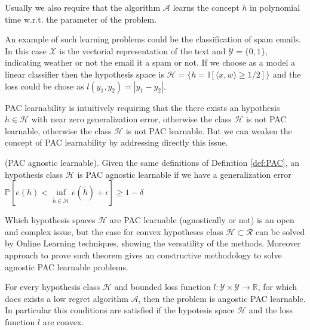 Usually we also require that the algorithm $\mathcal A$ learns the concept $h$ in polynomial time w.r.t. the parameter of the problem. 

An example of such learning problems could be the classification of spam emails. In this case $\mathcal X$ is the vectorial representation of the text and $\mathcal Y=\{0,1\}$, indicating weather or not the email it a spam or not. If we choose as a model a linear classifier then the hypothesis space is $\mathcal H=\{h = \mathbb I[\langle x,w\rangle \ge 1/2]\}$ and the loss could be chose as $l(y_1,y_2)=|y_1-y_2|$.

PAC learnability is intuitively requiring that the there exists an hypothesis $h\in\mathcal H$ with near zero generalization error, otherwise the class $\mathcal H$ is not PAC learnable, otherwise the class $\mathcal H$ is not PAC learnable.
But we can weaken the concept of PAC learnability by addressing directly this issue.

\begin{definition}(PAC agnostic learnable).
    Given the same definitions of Definition \ref{def:PAC}, an hypothesis class $\mathcal H$ is PAC agnostic learnable if we have a generalization error $\mathbb P[e(h)<\inf\limits_{\tilde h\in\mathcal H}e(\tilde h)+\epsilon]\ge1-\delta$
\end{definition}

Which hypothesis spaces $\mathcal H$ are PAC learnable (agnostically or not) is an open and complex issue, but the case for convex hypotheses class $\mathcal H\subset\mathcal R$ can be solved by Online Learning techniques, showing the versatility of the methods. 
Moreover approach to prove such theorem gives an constructive methodology to solve agnostic PAC learnable problems.

\begin{theorem}
For every hypothesis class $\mathcal H$ and bounded loss function $l:\mathcal Y\times\mathcal Y\to \mathbb R$, for which does exists a low regret algorithm $\mathcal A$, then the problem is angostic PAC learnable. In particular this conditions are satisfied if the hypotesis space $\mathcal H$ and the loss function $l$ are convex.
\end{theorem}


